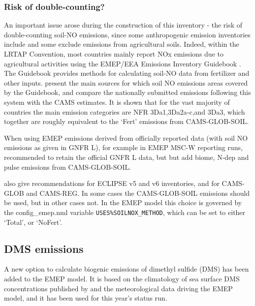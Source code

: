 \subsubsection{Risk of double-counting?}

An important issue arose during the construction  of this inventory - the risk of double-counting
soil-NO emissions, since some anthropogenic  emission inventories include and 
some exclude emissions from agricultural soils.
Indeed, within the LRTAP Convention,
most countries mainly report NOx emissions due to agricultural activities
using the EMEP/EEA Emissions Inventory Guidebook
\citep{Guidebook2019:3D}. The Guidebook provides methods for calculating
soil-NO data from fertilizer and other inputs.
\citet{SimpsonDarras:2021} present the main sources for which
 soil NO emissions areas covered by the Guidebook, and
compare the nationally
submitted emissions following this system with the CAMS estimates.
It is shown that for the vast majority of countries
the main emission categories are NFR  3Da1,3Da2a-c,and
3Da3, which together are roughly equivalent to
the `Fert' emissions from CAMS-GLOB-SOIL.

When using EMEP emissions derived from
officially reported data (with soil NO emissions as given in GNFR L),
for example in EMEP MSC-W reporting runs,
\citet{SimpsonDarras:2021} recommended to retain the
official GNFR L data, but but add biome, N-dep and pulse emissions from CAMS-GLOB-SOIL.

\citet{SimpsonDarras:2021} also give recommendations for
ECLIPSE v5 and v6 inventories, and for CAMS-GLOB and CAMS-REG. In
some cases the CAMS-GLOB-SOIL \Nfert emissions should be used, but
in other cases not. In the EMEP model this choice is governed
by the config\_emep.nml variable \verb|USES%SOILNOX_METHOD|, which can
be set to either `Total', or `NoFert'. 



\subsection{DMS emissions}
\label{ssec:DMS}


A new option to calculate biogenic emissions of dimethyl sulfide (DMS) has been added to the EMEP model. It is based on the climatology of sea surface DMS concentrations published by \citet{Lana2011} and the meteorological data driving the EMEP model, and it has been used for this year's status run. 

